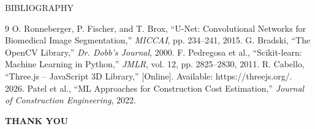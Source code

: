 \documentclass[aspectratio=169]{beamer}
\begin{document}
\begin{frame}{BIBLIOGRAPHY}
\small
\begin{thebibliography}{9}
O. Ronneberger, P. Fischer, and T. Brox,
``U-Net: Convolutional Networks for Biomedical Image Segmentation,''
\textit{MICCAI}, pp. 234--241, 2015.
G. Bradski, ``The OpenCV Library,''
\textit{Dr. Dobb's Journal}, 2000.
F. Pedregosa et al., ``Scikit-learn: Machine Learning in Python,''
\textit{JMLR}, vol. 12, pp. 2825--2830, 2011.
R. Cabello, ``Three.js -- JavaScript 3D Library,''
[Online]. Available: https://threejs.org/. 2026.
Patel et al., ``ML Approaches for Construction Cost Estimation,''
\textit{Journal of Construction Engineering}, 2022.
\end{thebibliography}
\end{frame}

\begin{frame}
\centering
\Huge \textbf{THANK YOU}


\end{frame}
\end{document}
